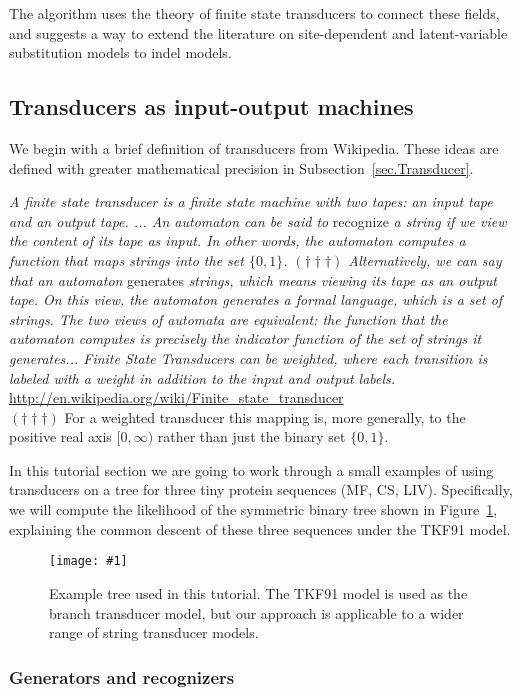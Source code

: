 \documentclass{article}
\newcommand{\secref}[1]{Subsection~\ref{sec.#1}}
\newcommand{\figref}[1]{Figure~\ref{Figures.#1}}
\newcommand{\figlabel}[1]{\label{Figures.#1}}
\newcommand{\easyfig}[4]{
\begin{figure}
\texttt{[image: \#1]}
\caption{ \figlabel{#3} #4}
\end{figure}}
\newcommand{\pdffig}[2]{\easyfig{#1-fig.pdf}{}{#1}{#2}}
\begin{document}
The algorithm uses the theory of finite state transducers to connect these fields,
and suggests a way to extend the literature on
site-dependent and latent-variable substitution models \cite{Yang94,Bruno96,YangEtAl2000,HolmesRubin2002b}
to indel models.


\subsection{Transducers as input-output machines}

We begin with a brief definition of transducers from Wikipedia.  
These ideas are defined with greater mathematical precision in \secref{Transducer}.

{\em A finite state transducer is a finite state machine with two tapes: an input tape and an output tape. ... An automaton can be said to } recognize {\em a string if we view the content of its tape as input. In other words, the automaton computes a function that maps strings into the set $\{0,1\}$. $(\dagger\dagger\dagger)$ Alternatively, we can say that an automaton } generates {\em strings, which means viewing its tape as an output tape. On this view, the automaton generates a formal language, which is a set of strings. The two views of automata are equivalent: the function that the automaton computes is precisely the indicator function of the set of strings it generates... Finite State Transducers can be weighted, where each transition is labeled with a weight in addition to the input and output labels. }
\url{http://en.wikipedia.org/wiki/Finite_state_transducer}
\\
$(\dagger\dagger\dagger)$ For a weighted transducer this mapping is,
more generally, to the positive real axis $[0,\infty)$
rather than just the binary set $\{0,1\}$.

In this tutorial section we are going to work through a small examples of using transducers on a tree
for three tiny protein sequences (MF, CS, LIV).
Specifically, we will compute the likelihood of the symmetric binary tree shown in \figref{cs-mf-liv-tree},
explaining the common descent of these three sequences
under the TKF91 model.
\pdffig{cs-mf-liv-tree}{Example tree used in this tutorial.  
The TKF91 model is used as the branch transducer model, but our approach 
is applicable to a wider range of string transducer models.  }

\subsubsection{Generators and recognizers}
\end{document}
